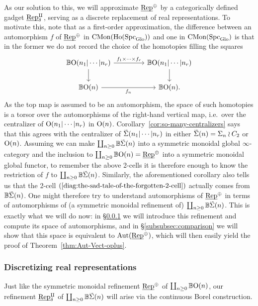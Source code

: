 \documentclass[reqno]{memo-l}
\theoremstyle{mythm}
\theoremstyle{definition}
\numberwithin{equation}{section}
\DeclareMathOperator{\Spc}{Spc}
\DeclareMathOperator{\CMon}{CMon}
\renewcommand{\O}{{\textup{O}}}
\newcommand{\Sig}{\smash{\widetilde{\vphantom{t}\smash{\Sigma}}}}
\newcommand{\Glo}{\textup{Glo}}
\newcommand{\BGcat}[1]{\mathbb B{#1}}
\newcommand{\Aut}{\textup{Aut}}
\newcommand{\ulhelper}[2]{\underline{\setbox0=\hbox{$#1#2$}\dp0=0.4pt \box0\relax}}
\newcommand{\ul}[1]{{\mathpalette\ulhelper{#1}}\hbox{\rule[-2pt]{0pt}{0pt}}}
\newcommand{\Vect}{\textup{Rep}}
\begin{document}
As our solution to this, we will approximate $\ul\Vect^\oplus$ by a categorically defined gadget $\ul\Vect_\delta^\amalg$, serving as a discrete replacement of real representations. To motivate this, note that as a first-order approximation, the difference between an automorphism $f$ of $\ul\Vect^\oplus$ in $\CMon(\text{Ho}(\Spc_\Glo))$ and one in $\CMon(\Spc_\Glo)$ is that in the former we do not record the choice of the homotopies filling the squares
\begin{equation}\label{diag:the-sad-tale-of-the-forgotten-2-cell}
    \begin{tikzcd}
        \BGcat{\O(n_1|\cdots|n_r)}\arrow[d]\arrow[r,"f_1\times\cdots\times f_r"] &[2em] \BGcat{\O(n_1|\cdots|n_r)}\arrow[d]\\
        \BGcat{\O(n)}\arrow[r,"f_n"'] & \BGcat{\O(n)}.
    \end{tikzcd}
\end{equation}
As the top map is assumed to be an automorphism, the space of such homotopies is a torsor over the automorphisms of the right-hand vertical map, i.e.~over the centralizer of ${\O(n_1|\cdots|n_r)}$ in ${\O(n)}$. Corollary~\ref{cor:so-many-centralizers} says that this agrees with the centralizer of $\Sig(n_1|\cdots|n_r)$ in either $\Sig(n)=\Sigma_n\wr C_2$ or $\O(n)$. Assuming we can make $\coprod_{n\ge0}\BGcat{\Sig(n)}$ into a symmetric monoidal global $\infty$-category and the inclusion to $\coprod_{n\ge0}\BGcat{\O(n)}=\ul\Vect^\oplus$ into a symmetric monoidal global functor,  to remember the above 2-cells it is therefore enough to know the restriction of $f$ to $\coprod_{n\ge0}\BGcat{\Sig(n)}$. Similarly, the aforementioned corollary also tells us that the 2-cell $(\ref{diag:the-sad-tale-of-the-forgotten-2-cell})$ actually comes from $\BGcat{\Sig(n)}$. One might therefore try to understand automorphisms of $\ul\Vect^\oplus$ in terms of automorphisms of (a symmetric monoidal refinement of) $\coprod_{n\ge0}\BGcat{\Sig(n)}$. This is exactly what we will do now: in §\ref{subsubsec:Vect-delta} we will introduce this refinement and compute its space of automorphisms, and in §\ref{subsubsec:comparison} we will show that this space is equivalent to $\Aut(\ul\Vect^\oplus)$, which will then easily yield the proof of Theorem~\ref{thm:Aut-Vect-oplus}.

\medskip
\subsubsection{Discretizing real representations}\label{subsubsec:Vect-delta}
Just like the symmetric monoidal refinement $\ul\Vect^\oplus$ of $\coprod_{n\ge0} \BGcat{\O(n)}$, our refinement $\ul\Vect^\amalg_\delta$ of $\coprod_{n\ge0}\BGcat{\Sig(n)}$ will arise via the continuous Borel construction.
\end{document}

